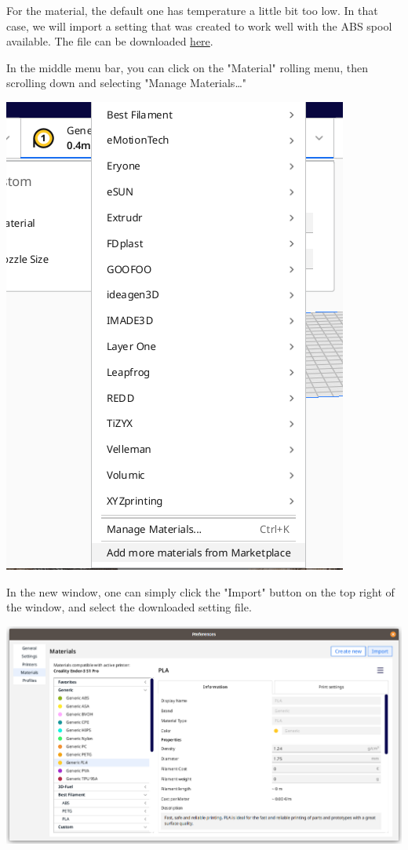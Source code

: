\documentclass[a4paper,11pt]{article}
\begin{document}
For the material, the default one has temperature a little bit too low.
In that case, we will import a setting that was created to work well with the
ABS spool available.
The file can be downloaded \href{https://gitlab.com/sunoc/Marlin/-/snippets/2540628}{here}.

In the middle menu bar, you can click on the "Material" rolling menu, then scrolling down
and selecting "Manage Materials\ldots{}"

\begin{center}
\includegraphics[width=.7\linewidth]{img/cura/4.png}
\end{center}

In the new window, one can simply click the "Import" button on the top right of the window,
and select the downloaded setting file.

\begin{center}
\includegraphics[width=.9\linewidth]{img/cura/5.png}
\end{center}
\end{document}
